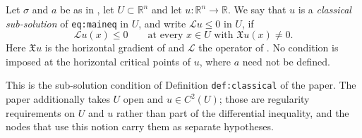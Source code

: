 \begin{definition}
Let $\sigma$ and $a$ be as in , let $U\subset\mathbb{R}^n$ and let
$u:\mathbb{R}^n\to\mathbb{R}$. We say that $u$ is a \emph{classical sub-solution} of
\texttt{eq:maineq} in $U$, and write $\mathcal{L}u\leq0$ in $U$, if
$$\mathcal{L}u(x)\leq0\qquad\text{at every }x\in U\text{ with }\mathfrak{X}u(x)\neq0 .$$
Here $\mathfrak{X}u$ is the horizontal gradient of  and $\mathcal{L}$ the operator
of . No condition is imposed at the horizontal critical points of $u$,
where $a$ need not be defined.

This is the sub-solution condition of Definition \texttt{def:classical} of the paper. The paper
additionally takes $U$ open and $u\in C^2(U)$; those are regularity requirements on $U$ and $u$
rather than part of the differential inequality, and the nodes that use this notion carry them as
separate hypotheses.
\end{definition}
